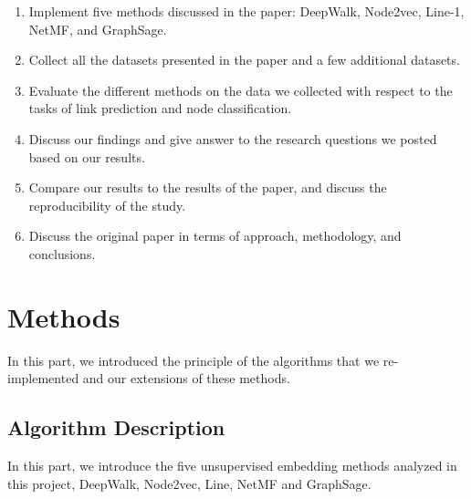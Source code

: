 \documentclass[a4paper]{article}
\begin{document}
\begin{enumerate}[1.]

\item Implement five methods discussed in the paper: DeepWalk, Node2vec, Line-1, NetMF, and GraphSage. 

\item Collect all the datasets presented in the paper and a few additional datasets.

\item Evaluate the different methods on the data we collected with respect to the tasks of link prediction and node classification.

\item Discuss our findings and give answer to the research questions we posted based on our results.

\item Compare our results to the results of the paper, and discuss the reproducibility of the study.

\item Discuss the original paper in terms of approach, methodology, and conclusions.

\end{enumerate}


\section{Methods}


\noindent In this part, we introduced the principle of the algorithms that we re-implemented and our extensions of these methods.



\subsection{Algorithm Description}
\noindent In this part, we introduce the five unsupervised embedding methods analyzed in this project, DeepWalk, Node2vec, Line, NetMF and GraphSage.
\end{document}
